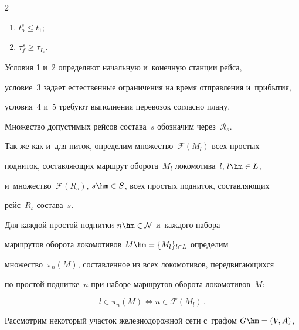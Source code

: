 \begin{multicols}{2}
\begin{enumerate}[(1)]
\item  $t^s_o \leqslant t_1$;





\item  $\tau^s_f \geqslant \tau_{I_s}$.


\end{enumerate}








Условия 1 и~2 определяют начальную и~конечную станции рейса, 


условие~3 задает естественные ограничения на время отправления и~прибытия, 


условия~4 и~5 требуют выполнения перевозок согласно плану.





Множество допустимых рейсов состава~$s$ обозначим через~$\mathcal R_s$.





Так же как и~для ниток, определим множество~$\mathcal F(M_l)$ всех простых 


подниток, со\-став\-ля\-ющих маршрут оборота~$M_l$ локомотива~$l$, $l\hm\in L$, 


и~множество~$\mathcal F(R_s)$, $s\hm\in S$, всех простых подниток, со\-став\-ля\-ющих 


рейс~$R_s$ состава~$s$.





Для каждой простой поднитки $n\hm\in\mathcal N$ и~каждого набора 


маршрутов оборота локомотивов  $M\hm=\{M_l\}_{l\in L}$ определим 


множество~$\pi_{n}(M)$, со\-став\-лен\-ное из всех локомотивов, передвигающихся 


по простой поднитке~$n$ при наборе маршрутов оборота локомотивов~$M$:


\begin{equation*}


    l\in \pi_{n}(M) \Leftrightarrow n\in\mathcal F\left(M_l\right)\,.


\end{equation*}





Рассмотрим некоторый участок железнодорожной сети с~графом $G\hm = (V, A)$, 



\end{multicols}
